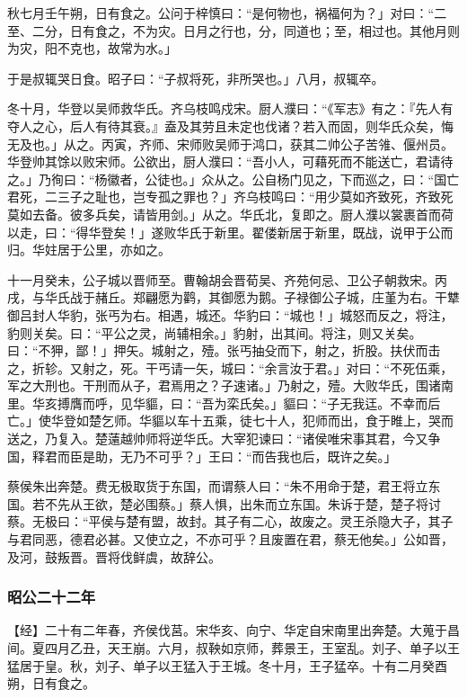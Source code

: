 \documentclass[]{article}
\begin{document}
秋七月壬午朔，日有食之。公问于梓慎曰：``是何物也，祸福何为？」对曰：``二至、二分，日有食之，不为灾。日月之行也，分，同道也；至，相过也。其他月则为灾，阳不克也，故常为水。」

于是叔辄哭日食。昭子曰：``子叔将死，非所哭也。」八月，叔辄卒。

冬十月，华登以吴师救华氏。齐乌枝鸣戍宋。厨人濮曰：``《军志》有之：『先人有夺人之心，后人有待其衰。』盍及其劳且未定也伐诸？若入而固，则华氏众矣，悔无及也。」从之。丙寅，齐师、宋师败吴师于鸿口，获其二帅公子苦雂、偃州员。华登帅其馀以败宋师。公欲出，厨人濮曰：``吾小人，可藉死而不能送亡，君请待之。」乃徇曰：``杨徽者，公徒也。」众从之。公自杨门见之，下而巡之，曰：``国亡君死，二三子之耻也，岂专孤之罪也？」齐乌枝鸣曰：``用少莫如齐致死，齐致死莫如去备。彼多兵矣，请皆用剑。」从之。华氏北，复即之。厨人濮以裳裹首而荷以走，曰：``得华登矣！」遂败华氏于新里。翟偻新居于新里，既战，说甲于公而归。华妵居于公里，亦如之。

十一月癸未，公子城以晋师至。曹翰胡会晋荀吴、齐苑何忌、卫公子朝救宋。丙戌，与华氏战于赭丘。郑翩愿为鹳，其御愿为鹅。子禄御公子城，庄堇为右。干犨御吕封人华豹，张丐为右。相遇，城还。华豹曰：``城也！」城怒而反之，将注，豹则关矣。曰：``平公之灵，尚辅相余。」豹射，出其间。将注，则又关矣。曰：``不狎，鄙！」押矢。城射之，殪。张丐抽殳而下，射之，折股。扶伏而击之，折轸。又射之，死。干丐请一矢，城曰：``余言汝于君。」对曰：``不死伍乘，军之大刑也。干刑而从子，君焉用之？子速诸。」乃射之，殪。大败华氏，围诸南里。华亥搏膺而呼，见华貙，曰：``吾为栾氏矣。」貙曰：``子无我迋。不幸而后亡。」使华登如楚乞师。华貙以车十五乘，徒七十人，犯师而出，食于睢上，哭而送之，乃复入。楚薳越帅师将逆华氏。大宰犯谏曰：``诸侯唯宋事其君，今又争国，释君而臣是助，无乃不可乎？」王曰：``而告我也后，既许之矣。」

蔡侯朱出奔楚。费无极取货于东国，而谓蔡人曰：``朱不用命于楚，君王将立东国。若不先从王欲，楚必围蔡。」蔡人惧，出朱而立东国。朱诉于楚，楚子将讨蔡。无极曰：``平侯与楚有盟，故封。其子有二心，故废之。灵王杀隐大子，其子与君同恶，德君必甚。又使立之，不亦可乎？且废置在君，蔡无他矣。」公如晋，及河，鼓叛晋。晋将伐鲜虞，故辞公。

\hypertarget{header-n2725}{%
\subsubsection{昭公二十二年}\label{header-n2725}}

【经】二十有二年春，齐侯伐莒。宋华亥、向宁、华定自宋南里出奔楚。大蒐于昌间。夏四月乙丑，天王崩。六月，叔鞅如京师，葬景王，王室乱。刘子、单子以王猛居于皇。秋，刘子、单子以王猛入于王城。冬十月，王子猛卒。十有二月癸酉朔，日有食之。
\end{document}
